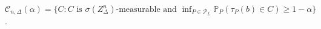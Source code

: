 \(\mathcal C_{n,\Delta}(\alpha)=\{C:C\text{ is }\sigma(Z_\Delta^n)\text{-measurable and }\inf_{P\in\mathcal P_L}\mathbb P_P(\tau_P(b)\in C)\geq1-\alpha\}\).